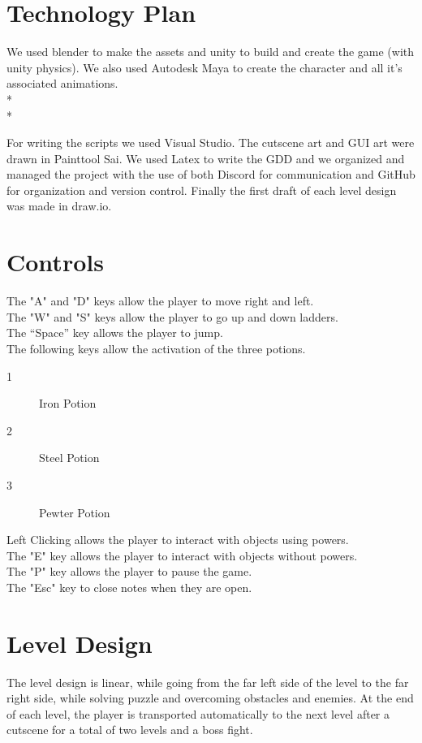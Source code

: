 \documentclass{article}
\begin{document}
\section{Technology Plan}
We used blender to make the assets and unity to build and create the game (with unity physics). We also used Autodesk Maya to create the character and all it's associated animations.\\*\\*

For writing the scripts we used Visual Studio. The cutscene art and GUI art were drawn in Painttool Sai. We used Latex to write the GDD and we organized and managed the project with the use of both Discord for communication and GitHub for organization and version control. Finally the first draft of each level design was made in draw.io.

\section{Controls}
The "A" and "D" keys allow the player to move right and left.\\
The "W" and "S" keys allow the player to go up and down ladders.\\
The “Space” key allows the player to jump.\\
The following keys allow the activation of the three potions.
\begin{description}
	\item[1] Iron Potion
	\item[2] Steel Potion
	\item[3] Pewter Potion
\end{description}
Left Clicking allows the player to interact with objects using powers.\\
The "E" key allows the player to interact with objects without powers.\\
The "P" key allows the player to pause the game.\\
The "Esc" key to close notes when they are open.

\section{Level Design}
The level design is linear, while going from the far left side of the level to the far right side, while solving puzzle and overcoming obstacles and enemies. At the end of each level, the player is transported automatically to the next level after a cutscene for a total of two levels and a boss fight.\\
\end{document}

